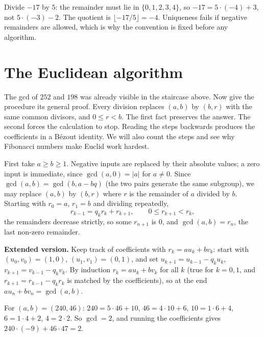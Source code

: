 \begin{examplex}
Divide $-17$ by $5$: the remainder must lie in $\{0,1,2,3,4\}$, so $-17=5\cdot(-4)+3$, not $5\cdot(-3)-2$. The quotient is $\lfloor -17/5\rfloor=-4$. Uniqueness fails if negative remainders are allowed, which is why the convention is fixed before any algorithm.
\end{examplex}

\section{The Euclidean algorithm}

The gcd of $252$ and $198$ was already visible in the staircase above. Now give the procedure its general proof. Every division replaces $(a,b)$ by $(b,r)$ with the same common divisors, and $0\le r<b$. The first fact preserves the answer. The second forces the calculation to stop. Reading the steps backwards produces the coefficients in a B\'ezout identity. We will also count the steps and see why Fibonacci numbers make Euclid work hardest.

First take $a\ge b\ge1$. Negative inputs are replaced by their absolute values; a zero input is immediate, since $\gcd(a,0)=|a|$ for $a\ne0$. Since $\gcd(a,b)=\gcd(b,a-bq)$ (the two pairs generate the same subgroup), we may replace $(a,b)$ by $(b,r)$ where $r$ is the remainder of $a$ divided by $b$. Starting with $r_0=a$, $r_1=b$ and dividing repeatedly,
\[
r_{k-1}=q_kr_k+r_{k+1},\qquad0\le r_{k+1}<r_k,
\]
the remainders decrease strictly, so some $r_{n+1}$ is $0$, and $\gcd(a,b)=r_n$, the last non-zero remainder.

\textbf{Extended version.} Keep track of coefficients with $r_k=au_k+bv_k$: start with $(u_0,v_0)=(1,0)$, $(u_1,v_1)=(0,1)$, and set $u_{k+1}=u_{k-1}-q_ku_k$, $v_{k+1}=v_{k-1}-q_kv_k$. By induction $r_k=au_k+bv_k$ for all $k$ (true for $k=0,1$, and $r_{k+1}=r_{k-1}-q_kr_k$ is matched by the coefficients), so at the end $au_n+bv_n=\gcd(a,b)$.

\begin{example}
For $(a,b)=(240,46)$: $240=5\cdot46+10$, $46=4\cdot10+6$, $10=1\cdot6+4$, $6=1\cdot4+2$, $4=2\cdot2$. So $\gcd=2$, and running the coefficients gives $240\cdot(-9)+46\cdot47=2$.
\end{example}

